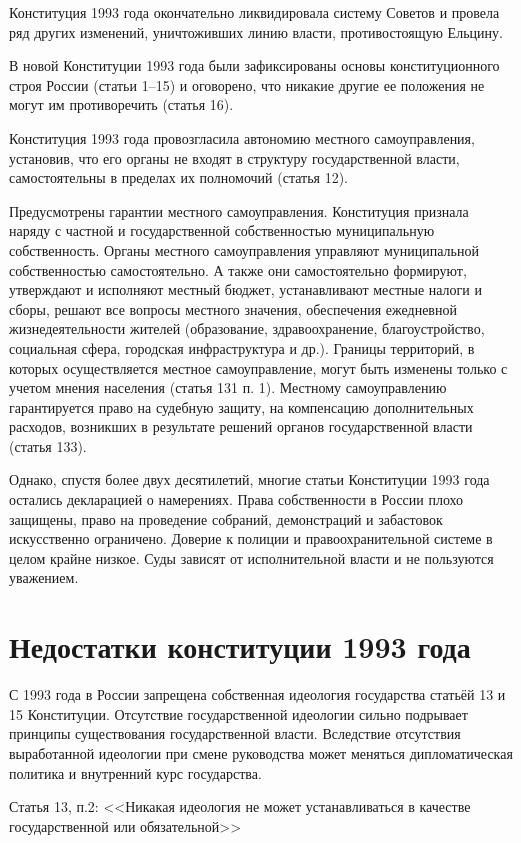 \documentclass[a4paper,12pt]{diss_4}
\begin{document}
Конституция 1993 года окончательно ликвидировала систему Советов и провела ряд других изменений, уничтоживших линию власти, противостоящую Ельцину.

В новой Конституции 1993 года были зафиксированы основы конституционного строя России (статьи 1–15) и оговорено, что никакие другие ее положения не могут им противоречить (статья 16).

Конституция 1993 года провозгласила автономию местного самоуправления, установив, что его органы не входят в структуру государственной власти, самостоятельны в пределах их полномочий (статья 12).

Предусмотрены гарантии местного самоуправления. Конституция признала наряду с частной и государственной собственностью муниципальную собственность. Органы местного самоуправления управляют муниципальной собственностью самостоятельно. А также они самостоятельно формируют, утверждают и исполняют местный бюджет, устанавливают местные налоги и сборы, решают все вопросы местного значения, обеспечения ежедневной жизнедеятельности жителей (образование, здравоохранение, благоустройство, социальная сфера, городская инфраструктура и др.). Границы территорий, в которых осуществляется местное самоуправление, могут быть изменены только с учетом мнения населения (статья 131 п. 1). Местному самоуправлению гарантируется право на судебную защиту, на компенсацию дополнительных расходов, возникших в результате решений органов государственной власти (статья 133).

Однако, спустя более двух десятилетий, многие статьи Конституции 1993 года остались декларацией о намерениях. Права собственности в России плохо защищены, право на проведение собраний, демонстраций и забастовок искусственно ограничено. Доверие к полиции и правоохранительной системе в целом крайне низкое. Суды зависят от исполнительной власти и не пользуются уважением.

\chapter{Недостатки конституции 1993 года}

С 1993 года в России запрещена собственная идеология государства статьёй 13 и 15 Конституции. Отсутствие государственной идеологии сильно подрывает принципы существования государственной власти. Вследствие отсутствия выработанной идеологии при смене руководства может меняться дипломатическая политика и внутренний курс государства.

Статья 13, п.2: <<Никакая идеология не может устанавливаться в качестве государственной или обязательной>>
\end{document}
